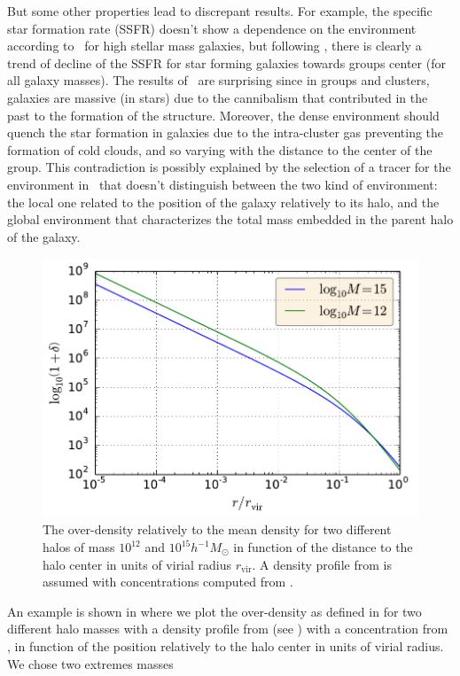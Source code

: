 But some other properties lead to discrepant results. For example, the specific
star formation rate (SSFR) doesn't show a dependence on the environment
according to~\cite{Peng+10} for high stellar mass galaxies, but following
\citet{vonderLinden+10}, there is clearly a trend of decline of the SSFR for
star forming galaxies towards groups center (for all galaxy masses). The
results of~\cite{Peng+10} are surprising since in groups and clusters, galaxies
are massive (in stars) due to the cannibalism that contributed in the past to
the formation of the structure. Moreover, the dense environment should quench
the star formation in galaxies due to the intra-cluster gas preventing the
formation of cold clouds, and so varying with the distance to the center of the
group. This contradiction is possibly explained by the selection of a tracer
for the environment in~\cite{Peng+10} that doesn't distinguish between the two
kind of environment: the local one related to the position of the galaxy
relatively to its halo, and the global environment that characterizes the total
mass embedded in the parent halo of the galaxy.
%
\begin{figure}[htb]
    \centering
    \includegraphics[width=0.6\linewidth]{figures/introduction/overdensity.pdf}
    \caption{The over-density relatively to the mean density for two different
        halos of mass $10^{12}$ and $10^{15} h^{-1} M_\odot$ in function of the
        distance to the halo center in units of virial radius $r_\mathrm{vir}$.
        A density profile from \citet{NFW+97} is assumed with concentrations
    computed from \citet{Maccio+08}.\label{fig:overdensity}}
\end{figure}
%
An example is shown in  where we plot the
over-density as defined in \citet{Peng+10} for two different halo masses with a
density profile from \citet{NFW+97} (see ) with a
concentration from \citet{Maccio+08}, in function of the position relatively to
the halo center in units of virial radius. We chose two extremes masses
